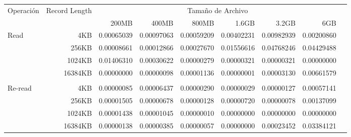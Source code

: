 \begin{table}[!htp]\centering

\scriptsize
\begin{tabular}{lrrrrrrrr}\toprule
Operación &Record Length &\multicolumn{6}{c}{Tamaño de Archivo} \\\cmidrule{1-8}
& &200MB &400MB &800MB &1.6GB &3.2GB &6GB \\\midrule
\multirow{4}{*}{Read} &4KB &\cellcolor[HTML]{f4c7c3}0.00065039 &\cellcolor[HTML]{f4c7c3}0.00097063 &\cellcolor[HTML]{f4c7c3}0.00059209 &\cellcolor[HTML]{f4c7c3}0.00402231 &\cellcolor[HTML]{f4c7c3}0.00982939 &\cellcolor[HTML]{f4c7c3}0.00200860 \\
&256KB &\cellcolor[HTML]{f4c7c3}0.00008661 &\cellcolor[HTML]{f4c7c3}0.00012866 &\cellcolor[HTML]{f4c7c3}0.00027670 &\cellcolor[HTML]{f4c7c3}0.01556616 &\cellcolor[HTML]{f4c7c3}0.04768246 &\cellcolor[HTML]{f4c7c3}0.04429488 \\
&1024KB &\cellcolor[HTML]{f4c7c3}0.01406310 &\cellcolor[HTML]{f4c7c3}0.00030622 &\cellcolor[HTML]{f4c7c3}0.00000279 &\cellcolor[HTML]{f4c7c3}0.00000321 &\cellcolor[HTML]{f4c7c3}0.00000321 &\cellcolor[HTML]{f4c7c3}0.00000000 \\
&16384KB &\cellcolor[HTML]{f4c7c3}0.00000000 &\cellcolor[HTML]{f4c7c3}0.00000098 &\cellcolor[HTML]{f4c7c3}0.00001136 &\cellcolor[HTML]{f4c7c3}0.00000001 &\cellcolor[HTML]{f4c7c3}0.00003130 &\cellcolor[HTML]{f4c7c3}0.00661579 \\
& & & & & & & \\
\multirow{4}{*}{Re-read} &4KB &\cellcolor[HTML]{f4c7c3}0.00000085 &\cellcolor[HTML]{f4c7c3}0.00006437 &\cellcolor[HTML]{f4c7c3}0.00000290 &\cellcolor[HTML]{f4c7c3}0.00000029 &\cellcolor[HTML]{f4c7c3}0.00000127 &\cellcolor[HTML]{f4c7c3}0.00057141 \\
&256KB &\cellcolor[HTML]{f4c7c3}0.00001505 &\cellcolor[HTML]{f4c7c3}0.00000678 &\cellcolor[HTML]{f4c7c3}0.00000128 &\cellcolor[HTML]{f4c7c3}0.00000720 &\cellcolor[HTML]{f4c7c3}0.00000078 &\cellcolor[HTML]{f4c7c3}0.00137099 \\
&1024KB &\cellcolor[HTML]{f4c7c3}0.00001438 &\cellcolor[HTML]{f4c7c3}0.00001045 &\cellcolor[HTML]{f4c7c3}0.00000010 &\cellcolor[HTML]{f4c7c3}0.00000000 &\cellcolor[HTML]{f4c7c3}0.00000000 &\cellcolor[HTML]{f4c7c3}0.00000000 \\
&16384KB &\cellcolor[HTML]{f4c7c3}0.00000138 &\cellcolor[HTML]{f4c7c3}0.00000385 &\cellcolor[HTML]{f4c7c3}0.00000057 &\cellcolor[HTML]{f4c7c3}0.00000000 &\cellcolor[HTML]{f4c7c3}0.00023452 &\cellcolor[HTML]{f4c7c3}0.03384121 \\

\end{tabular}
\end{table}
